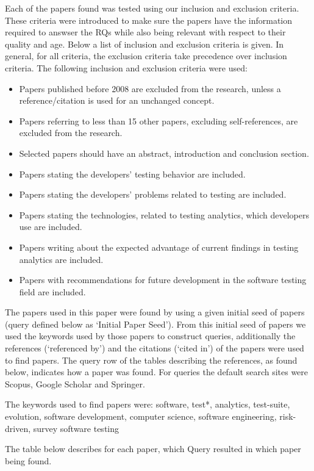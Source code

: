 \documentclass[]{book}
\providecommand{\tightlist}{%
  \setlength{\itemsep}{0pt}\setlength{\parskip}{0pt}}
\begin{document}
Each of the papers found was tested using our inclusion and exclusion
criteria. These criteria were introduced to make sure the papers have
the information required to answser the RQs while also being relevant
with respect to their quality and age. Below a list of inclusion and
exclusion criteria is given. In general, for all criteria, the exclusion
criteria take precedence over inclusion criteria. The following
inclusion and exclusion criteria were used:

\begin{itemize}
\tightlist
\item
  Papers published before 2008 are excluded from the research, unless a
  reference/citation is used for an unchanged concept.
\item
  Papers referring to less than 15 other papers, excluding
  self-references, are excluded from the research.
\item
  Selected papers should have an abstract, introduction and conclusion
  section.
\item
  Papers stating the developers' testing behavior are included.
\item
  Papers stating the developers' problems related to testing are
  included.
\item
  Papers stating the technologies, related to testing analytics, which
  developers use are included.
\item
  Papers writing about the expected advantage of current findings in
  testing analytics are included.
\item
  Papers with recommendations for future development in the software
  testing field are included.
\end{itemize}

The papers used in this paper were found by using a given initial seed
of papers (query defined below as `Initial Paper Seed'). From this
initial seed of papers we used the keywords used by those papers to
construct queries, additionally the references (`referenced by') and the
citations (`cited in') of the papers were used to find papers. The query
row of the tables describing the references, as found below, indicates
how a paper was found. For queries the default search sites were Scopus,
Google Scholar and Springer.

The keywords used to find papers were: software, test*, analytics,
test-suite, evolution, software development, computer science, software
engineering, risk-driven, survey software testing

The table below describes for each paper, which Query resulted in which
paper being found.
\end{document}
